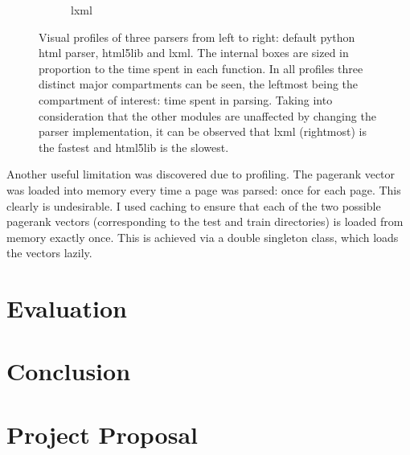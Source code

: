 \documentclass[12pt,twoside,notitlepage]{report}
\begin{document}
\begin{figure}
\begin{subfigure}[b]{.3\textwidth}
  \caption{lxml}
  \label{lxml}
\end{subfigure}
\caption{Visual profiles of three parsers from left to right: default python
html parser, html5lib and lxml. The internal boxes are sized in proportion to
the time spent in each function. In all profiles three distinct major
compartments can be seen, the leftmost being the compartment of interest: 
time spent in parsing. Taking into consideration that the other modules are unaffected by changing the parser
implementation, it can be observed that lxml (rightmost) is the fastest and
html5lib is the slowest.\label{parsers}}
\end{figure}

Another useful limitation was discovered due to profiling. The pagerank vector
was loaded into memory every time a page was parsed: once for each page. This
clearly is undesirable. I used caching to ensure that each of the two possible
pagerank vectors (corresponding to the test and train directories) is loaded
from memory exactly once. This is achieved via a double singleton class, which
loads the vectors lazily.
\cleardoublepage
\chapter{Evaluation}

\cleardoublepage
\chapter{Conclusion}
\cleardoublepage



\cleardoublepage

\appendix

\chapter{Project Proposal}

%
\end{document}
